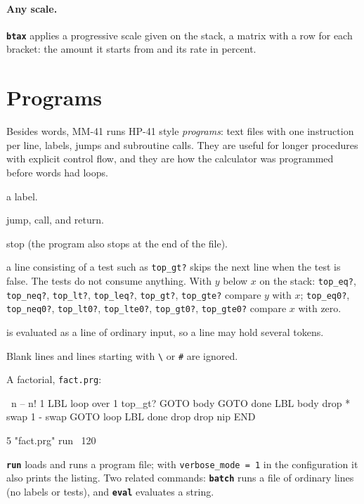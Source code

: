 \documentclass[11pt,letterpaper]{article}
\newcommand{\code}[1]{\texttt{#1}}
\newcommand{\cmd}[1]{\texttt{\textbf{#1}}}
\begin{document}
\paragraph{Any scale.} \cmd{btax} applies a progressive scale given on the stack, a matrix with a row for each bracket: the amount it starts from and its rate in percent.

\section{Programs}

Besides words, MM-41 runs HP-41 style \emph{programs}: text files with one instruction per line, labels, jumps and subroutine calls. They are useful for longer procedures with explicit control flow, and they are how the calculator was programmed before words had loops.

\begin{description}[style=nextline,leftmargin=1.5em]
  \item[\code{LBL name}] a label.
  \item[\code{GOTO name}, \code{GOSUB name}, \code{RTN}] jump, call, and return.
  \item[\code{END}] stop (the program also stops at the end of the file).
  \item[\emph{tests}] a line consisting of a test such as \code{top\_gt?} skips the next line when the test is false. The tests do not consume anything. With $y$ below $x$ on the stack: \code{top\_eq?}, \code{top\_neq?}, \code{top\_lt?}, \code{top\_leq?}, \code{top\_gt?}, \code{top\_gte?} compare $y$ with $x$; \code{top\_eq0?}, \code{top\_neq0?}, \code{top\_lt0?}, \code{top\_lte0?}, \code{top\_gt0?}, \code{top\_gte0?} compare $x$ with zero.
  \item[anything else] is evaluated as a line of ordinary input, so a line may hold several tokens.
\end{description}
Blank lines and lines starting with \code{\textbackslash} or \code{\#} are ignored.

A factorial, \code{fact.prg}:
\begin{rpn}
\ n -- n!
1
LBL loop
over 1
top_gt?
GOTO body
GOTO done
LBL body
drop *
swap 1 - swap
GOTO loop
LBL done
drop drop nip
END
\end{rpn}
\begin{rpn}
5 "fact.prg" run        \ 120
\end{rpn}
\cmd{run} loads and runs a program file; with \code{verbose\_mode = 1} in the configuration it also prints the listing. Two related commands: \cmd{batch} runs a file of ordinary lines (no labels or tests), and \cmd{eval} evaluates a string.
\end{document}
